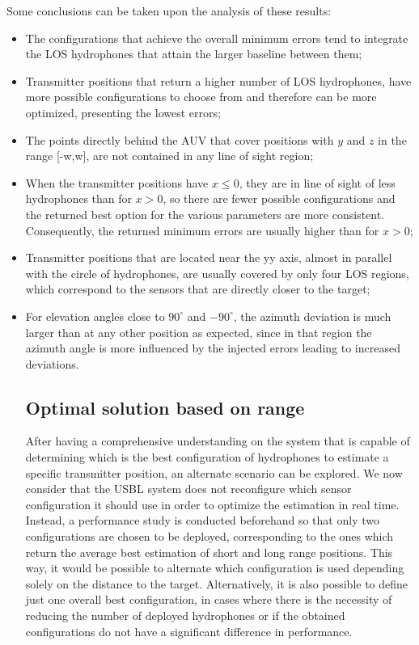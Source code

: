 Some conclusions can be taken upon the analysis of these results: 
\begin{itemize}
	\item The configurations that achieve the overall minimum errors tend to integrate the LOS hydrophones that attain the larger baseline between them;
	
	\item Transmitter positions that return a higher number of LOS hydrophones, have more possible configurations to choose from and therefore can be more optimized, presenting the lowest errors;
		
	\item The points directly behind the AUV that cover positions with $y$ and $z$ in the range [-w,w], are not contained in any line of sight region;
	
	\item When the transmitter positions have $x \leq 0$, they are in line of sight of less hydrophones than for $x > 0$, so there are fewer possible configurations and the returned best option for the various parameters are more consistent. Consequently, the returned minimum errors are usually higher than for $x > 0$;
	
	\item Transmitter positions that are located near the yy axis, almost in parallel with the circle of hydrophones, are usually covered by only four LOS regions, which correspond to the sensors that are directly closer to the target;
	
	\item For elevation angles close to $90^{\circ}$ and $-90^{\circ}$, the azimuth deviation is much larger than at any other position as expected, since in that region the azimuth angle is more influenced by the injected errors leading to increased deviations.

\subsection{Optimal solution based on range}

After having a comprehensive understanding on the system that is capable of determining which is the best configuration of hydrophones to estimate a specific transmitter position, an alternate scenario can be explored. We now consider that the USBL system does not reconfigure which sensor configuration it should use in order to optimize the estimation  in real time. Instead, a performance study is conducted beforehand so that only two configurations are chosen to be deployed, corresponding to the ones which return the average best estimation of short and long range positions. This way, it would be possible to alternate which configuration is used depending solely on the distance to the target. Alternatively, it is also possible to define just one overall best configuration, in cases where there is the necessity of reducing the number of deployed hydrophones or if the obtained configurations do not have a significant difference in performance.


\end{itemize}
